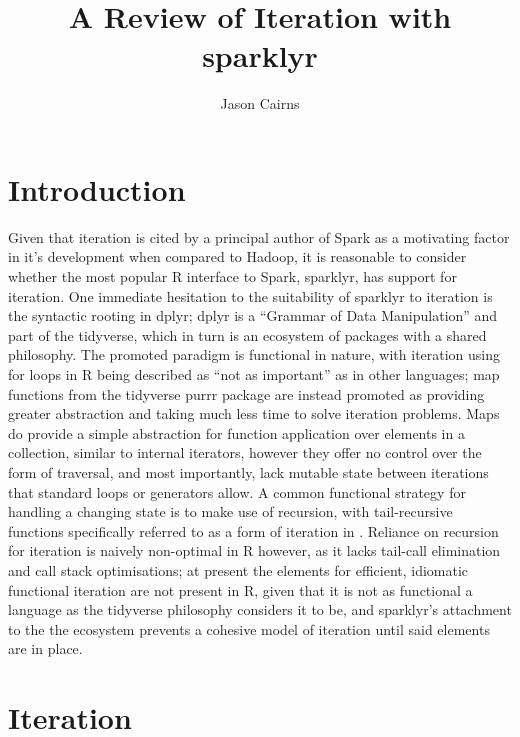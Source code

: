 \documentclass[10pt,a4paper]{article}
\begin{document}
\title{A Review of Iteration with sparklyr}
\author{Jason Cairns}
  
\maketitle{}

\section{Introduction}
Given that iteration is cited by a principal author of Spark as a motivating
factor in it's development when compared to Hadoop, it is reasonable to
consider whether the most popular R interface to Spark, sparklyr, has support
for iteration\cite{zaharia2010spark}\cite{luraschi20}.
One immediate hesitation to the suitability of sparklyr to iteration is the
syntactic rooting in dplyr; dplyr is a ``Grammar of Data Manipulation'' and part
of the tidyverse, which in turn is an ecosystem of packages with a shared
philosophy\cite{wickham2019welcome}\cite{wickham2016r}. 
The promoted paradigm is functional in nature, with iteration using for loops
in R being described as ``not as important'' as in other languages; 
map functions from the tidyverse purrr package are instead promoted as
providing greater abstraction and taking much less time to solve iteration
problems.
Maps do provide a simple abstraction for function application over elements in
a collection, similar to internal iterators, however they offer no control over
the form of traversal, and most importantly, lack mutable state between
iterations that standard loops or generators allow\cite{cousineau1998functional}.
A common functional strategy for handling a changing state is to make use of
recursion, with tail-recursive functions specifically referred to as a form of
iteration in \citeauthor{abelson1996structure}.
Reliance on recursion for iteration is naively non-optimal in R however, as it
lacks tail-call elimination and call stack optimisations\cite{rcore2020lang};
at present the elements for efficient, idiomatic functional iteration are not
present in R, given that it is not as functional a language as the tidyverse
philosophy considers it to be, and sparklyr's attachment to the the ecosystem
prevents a cohesive model of iteration until said elements are in place.

\section{Iteration}
\end{document}

